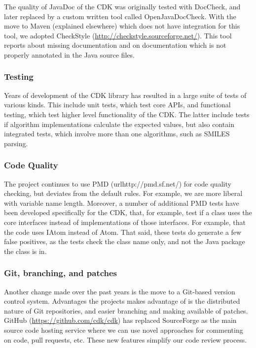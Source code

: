 \documentclass[10pt]{bmcart}
\begin{document}
  The quality of JavaDoc of the CDK was originally tested with DocCheck, and
  later replaced by a custom written tool called OpenJavaDocCheck. With the move
  to Maven (explained elsewhere) which does not have integration for this tool,
  we adopted CheckStyle (\url{http://checkstyle.sourceforge.net/}). This tool
  reports about missing documentation and on documentation which is not properly
  annotated in the Java source files.

  \subsubsection*{Testing}

  Years of development of the CDK library has resulted in a large suite of
  tests of various kinds. This include unit tests, which test core APIs, and
  functional testing, which test higher level functionality of the CDK. The
  latter include tests if algorithm implementations calculate the expected
  values, but also contain integrated tests, which involve more than one
  algorithms, such as SMILES parsing.

  \subsubsection*{Code Quality}

The project continues to use PMD (url{http://pmd.sf.net/}) for code quality checking,
but deviates from the default rules. For example, we are more liberal with 
variable name length. Moreover, a number of additional PMD tests have been
developed specifically for the CDK, that, for example, test if a class uses
the core interfaces instead of implementations of those interfaces. For example,
that the code uses IAtom instead of Atom. That said, these tests do generate a
few false positives, as the tests check the class name only, and not the
Java package the class is in.

  \subsubsection*{Git, branching, and patches}

Another change made over the past years is the move to a Git-based version
control system. Advantages the projects makes advantage of is the distributed
nature of Git repositories, and easier branching and making available of
patches. GitHub (\url{https://github.com/cdk/cdk}) has replaced SourceForge
as the main source code hosting service
where we can use novel approaches for commenting on code, pull requests, etc.
These new features simplify our code review process.
\end{document}
